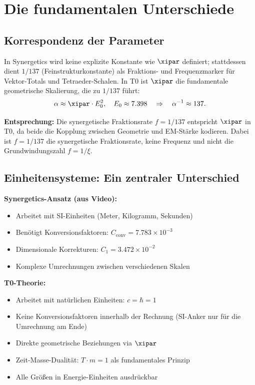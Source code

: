 	\section{Die fundamentalen Unterschiede}
	
	\subsection{Korrespondenz der Parameter}
	
	In Synergetics wird keine explizite Konstante wie $\xipar$ definiert; stattdessen dient $1/137$ (Feinstrukturkonstante) als Fraktions- und Frequenzmarker für Vektor-Totals und Tetraeder-Schalen. In T0 ist $\xipar$ die fundamentale geometrische Skalierung, die zu $1/137$ führt:
	\begin{equation}
		\alpha \approx \xipar \cdot E_0^2, \quad E_0 \approx 7.398 \quad \Rightarrow \quad \alpha^{-1} \approx 137.
	\end{equation}
	
	
	\textbf{Entsprechung:} Die synergetische Fraktionsrate $f = 1/137$ entspricht $\xipar$ in T0, da beide die Kopplung zwischen Geometrie und EM-Stärke kodieren. Dabei ist $f = 1/137$ die synergetische Fraktionsrate, keine Frequenz und nicht die Grundwindungszahl $f = 1/\xi$.

	\subsection{Einheitensysteme: Ein zentraler Unterschied}
	
	\begin{vergleich}
		\textbf{Synergetics-Ansatz (aus Video):}
		\begin{itemize}
			\item Arbeitet mit SI-Einheiten (Meter, Kilogramm, Sekunden)
			\item Benötigt Konversionsfaktoren: $C_{\text{conv}} = 7.783 \times 10^{-3}$
			\item Dimensionale Korrekturen: $C_1 = 3.472 \times 10^{-2}$
			\item Komplexe Umrechnungen zwischen verschiedenen Skalen
		\end{itemize}
		
		\textbf{T0-Theorie:}
		\begin{itemize}
			\item Arbeitet mit natürlichen Einheiten: $c = \hbar = 1$
			\item Keine Konversionsfaktoren innerhalb der Rechnung (SI-Anker nur für die Umrechnung am Ende)
			\item Direkte geometrische Beziehungen via $\xipar$
			\item Zeit-Masse-Dualität: $T \cdot m = 1$ als fundamentales Prinzip
			\item Alle Größen in Energie-Einheiten ausdrückbar
		\end{itemize}
	\end{vergleich}
	
